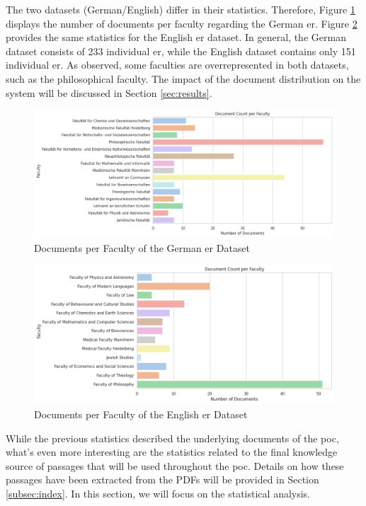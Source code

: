 The two datasets (German/English) differ in their statistics. Therefore, Figure \ref{fig:er-german-stats} displays the number of documents per faculty regarding the German \gls{er}. Figure \ref{fig:er-english-stats} provides the same statistics for the English \gls{er} dataset. In general, the German dataset consists of 233 individual \gls{er}, while the English dataset contains only 151 individual \gls{er}. As observed, some faculties are overrepresented in both datasets, such as the philosophical faculty. The impact of the document distribution on the system will be discussed in Section \ref{sec:results}.

\begin{figure}
    \centering
    \includegraphics[width=\textwidth]{Grafiken/Statistiken/PO_german_Document Count per Faculty.png}
    \caption{Documents per Faculty of the German \gls{er} Dataset}
    \label{fig:er-german-stats}
\end{figure}

\begin{figure}
    \centering
    \includegraphics[width=\textwidth]{Grafiken/Statistiken/PO_english_Document Count per Faculty.png}
    \caption{Documents per Faculty of the English \gls{er} Dataset}
    \label{fig:er-english-stats}
\end{figure}

While the previous statistics described the underlying documents of the \gls{poc}, what's even more interesting are the statistics related to the final knowledge source of passages that will be used throughout the \gls{poc}. Details on how these passages have been extracted from the PDFs will be provided in Section \ref{subsec:index}. In this section, we will focus on the statistical analysis.


